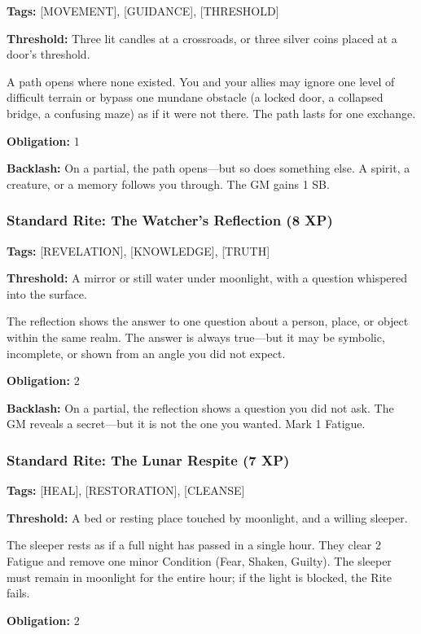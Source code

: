 \textbf{Tags:} [MOVEMENT], [GUIDANCE], [THRESHOLD]

\textbf{Threshold:} Three lit candles at a crossroads, or three silver coins placed at a door's threshold.

A path opens where none existed. You and your allies may ignore one level of difficult terrain or bypass one mundane obstacle (a locked door, a collapsed bridge, a confusing maze) as if it were not there. The path lasts for one exchange.

\textbf{Obligation:} 1

\textbf{Backlash:} On a partial, the path opens—but so does something else. A spirit, a creature, or a memory follows you through. The GM gains 1 SB.

\subsubsection{Standard Rite: The Watcher's Reflection (8 XP)}

\textbf{Tags:} [REVELATION], [KNOWLEDGE], [TRUTH]

\textbf{Threshold:} A mirror or still water under moonlight, with a question whispered into the surface.

The reflection shows the answer to one question about a person, place, or object within the same realm. The answer is always true—but it may be symbolic, incomplete, or shown from an angle you did not expect.

\textbf{Obligation:} 2

\textbf{Backlash:} On a partial, the reflection shows a question you did not ask. The GM reveals a secret—but it is not the one you wanted. Mark 1 Fatigue.

\subsubsection{Standard Rite: The Lunar Respite (7 XP)}

\textbf{Tags:} [HEAL], [RESTORATION], [CLEANSE]

\textbf{Threshold:} A bed or resting place touched by moonlight, and a willing sleeper.

The sleeper rests as if a full night has passed in a single hour. They clear 2 Fatigue and remove one minor Condition (Fear, Shaken, Guilty). The sleeper must remain in moonlight for the entire hour; if the light is blocked, the Rite fails.

\textbf{Obligation:} 2

